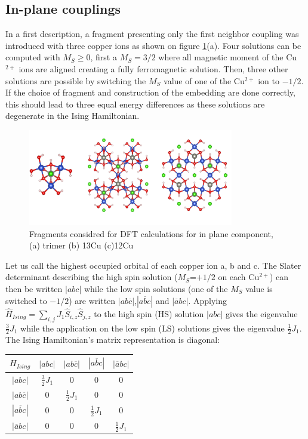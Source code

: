 \documentclass[10pt]{report}
\numberwithin{equation}{section}
\begin{document}
\subsection*{In-plane couplings}

In a first description, a fragment presenting only the first neighbor coupling was introduced with three copper ions as shown on figure \ref{FragmentDFT}(a).
Four solutions can be computed with $M_S$$\ge$$0$, first a $M_S=3/2$ where all magnetic moment of the Cu$^{2+}$ ions are aligned creating a fully ferromagnetic solution. 
Then, three other solutions are possible by switching the $M_S$ value of one of the Cu$^{2+}$ ion to $-1/2$. 
If the choice of fragment and construction of the embedding are done correctly, this should lead to three equal energy differences as these solutions are degenerate in the Ising Hamiltonian.

\begin{figure}[h!]
    \centering
    \includegraphics[width=0.8\textwidth]{Images/FragmentDFT_plan.png}
    \caption{Fragments considred for DFT calculations for in plane component, (a) trimer (b) 13Cu (c)12Cu}
    \label{FragmentDFT}
\end{figure}

Let us call the highest occupied orbital of each copper ion a, b and c. 
The Slater determinant describing the high spin solution ($M_S$=$+1/2$ on each Cu$^{2+}$) can then be written $|abc|$ while the low spin solutions (one of the $M_S$ value is switched to $-1/2$) are written $|ab\overline{c}|$,$|a\overline{b}c|$ and $|\overline{a}bc|$.
Applying $\hat{H}_{Ising}=\sum_{i,j}J_1 \hat{S}_{i,z}\hat{S}_{j,z}$ to the high spin (HS) solution $|abc|$ gives the eigenvalue $\frac{3}{2}J_1$ while the application on the low spin (LS) solutions gives the eigenvalue $\frac{1}{2}J_1$. 
The Ising Hamiltonian's matrix representation is diagonal:

\begin{center}
    \begin{tabular}{c | c c c c}
        $H_{Ising}$ & $|abc|$ & $|ab\overline{c}|$&$|a\overline{b}c|$ & $|\overline{a}bc|$\\
        \hline
        $|abc|$ & $\frac{3}{2}J_1$ & 0 & 0 & 0\\
        $|ab\overline{c}|$ & 0 & $\frac{1}{2}J_1 $& 0 & 0\\
        $|a\overline{b}c|$ & 0 & 0 & $\frac{1}{2}J_1 $ & 0 \\
        $|\overline{a}bc|$ & 0 & 0 & 0 & $\frac{1}{2}J_1 $
    \end{tabular}
\end{center}
\end{document}
